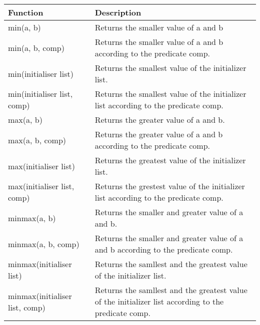 \begin{longtable}[c]{|l|l|}
\hline
\textbf{Function}           & \textbf{Description}                                                                \\ \hline
\endfirsthead
%
\endhead
%
min(a, b)                   & Returns the smaller value of a and b                                                \\ \hline
min(a, b, comp)             & Returns the smaller value of a and b according to the predicate comp.               \\ \hline
min(initialiser list)       & Returns the smallest value of the initializer list.                                 \\ \hline
min(initialiser list, comp) & Returns the smallest value of the initializer list according to the predicate comp. \\ \hline
max(a, b)                   & Returns the greater value of a and b.                                               \\ \hline
max(a, b, comp)             & Returns the greater value of a and b according to the predicate comp.               \\ \hline
max(initialiser list)       & Returns the greatest value of the initializer list.                                 \\ \hline
max(initialiser list, comp) & Returns the grestest value of the initializer list according to the predicate comp. \\ \hline
minmax(a, b)                & Returns the smaller and greater value of a and b.                                   \\ \hline
minmax(a, b, comp)          & Returns the smaller and greater value of a and b according to the predicate comp.   \\ \hline
minmax(initialiser list)    & Returns the samllest and the greatest value of the initializer list.                \\ \hline
minmax(initialiser list, comp) & Returns the samllest and the greatest value of the initializer list according to the predicate comp. \\ \hline
\end{longtable}


